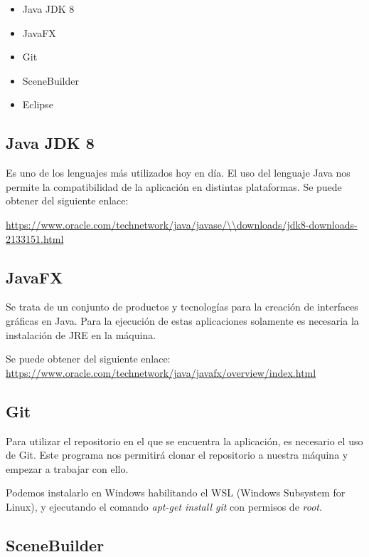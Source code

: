 \begin{itemize}
\item
Java JDK 8
\item
JavaFX
\item
Git
\item
SceneBuilder
\item
Eclipse
\end{itemize}

\subsection{Java JDK 8}

Es uno de los lenguajes más utilizados hoy en día. El uso del lenguaje Java nos permite la compatibilidad de la aplicación en distintas plataformas. Se puede obtener del siguiente enlace:

\url{https://www.oracle.com/technetwork/java/javase/\\downloads/jdk8-downloads-2133151.html}

\subsection{JavaFX}

Se trata de un conjunto de productos y tecnologías para la creación de interfaces gráficas en Java. Para la ejecución de estas aplicaciones solamente es necesaria la instalación de JRE en la máquina.

Se puede obtener del siguiente enlace:
\url{https://www.oracle.com/technetwork/java/javafx/overview/index.html}

\subsection{Git}

Para utilizar el repositorio en el que se encuentra la aplicación, es necesario el uso de Git. Este programa nos permitirá clonar el repositorio a nuestra máquina y empezar a trabajar con ello.

Podemos instalarlo en Windows habilitando el WSL (Windows Subsystem for Linux), y ejecutando el comando \emph{apt-get install git} con permisos de \emph{root}.


\subsection{SceneBuilder}

